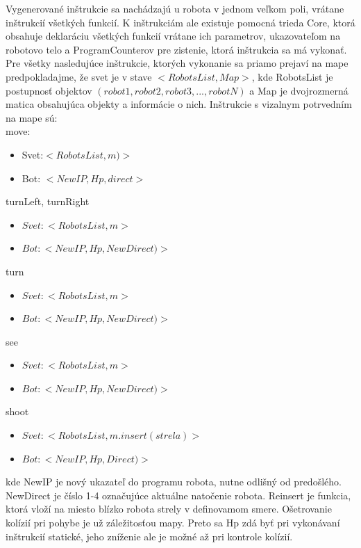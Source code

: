 Vygenerované inštrukcie sa nachádzajú u robota v jednom veľkom poli, vrátane inštrukcií všetkých funkcií. K inštrukciám ale existuje pomocná trieda Core, ktorá obsahuje deklaráciu všetkých funkcií vrátane ich parametrov, ukazovateľom na robotovo telo a ProgramCounterov pre zistenie, ktorá inštrukcia sa má vykonať. \\
Pre všetky nasledujúce inštrukcie, ktorých vykonanie sa priamo prejaví na mape predpokladajme, že svet je v stave $<RobotsList, Map>$, kde RobotsList je postupnosť objektov $(robot1,robot2, robot3,...,robotN)$ a Map je dvojrozmerná matica obsahujúca objekty a informácie o nich. Inštrukcie s vizalnym potrvedním na mape sú:\\
move:\begin {itemize}
\item Svet:$ < RobotsList, m) > $
\item Bot: $ < NewIP, Hp, direct> $
\end {itemize}
turnLeft, turnRight \begin{itemize}
\item $Svet:  <RobotsList, m>$
\item $Bot:  < NewIP, Hp, NewDirect)>$
\end{itemize}
turn  \begin{itemize}
\item $Svet:  < RobotsList, m > $
\item $Bot:   < NewIP, Hp, NewDirect)> $
\end {itemize}
see  \begin{itemize}
\item $Svet:  <RobotsList,m> $
\item $ Bot:  < NewIP, Hp, NewDirect)> $
\end {itemize}
shoot \begin {itemize}
\item $ Svet:  < RobotsList, m.insert(strela)> $ 
\item $ Bot:  < NewIP, Hp, Direct)>  $
\end {itemize}
\indent
kde NewIP je nový ukazateľ do programu robota, nutne odlišný od predošlého. NewDirect je číslo 1-4 označujúce aktuálne natočenie robota.
Reinsert je funkcia, ktorá vloží na miesto blízko robota strely v definovamom smere. Ošetrovanie kolízií pri pohybe je už záležitosťou mapy. Preto sa Hp zdá byť pri vykonávaní inštrukcií statické, jeho zníženie ale je možné až pri kontrole kolízií.

